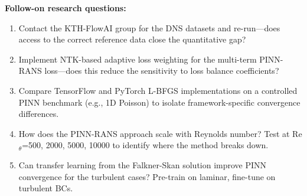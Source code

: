 \noindent\textbf{Follow-on research questions:}
\begin{enumerate}[leftmargin=1.6em,itemsep=0.2em,topsep=0.2em,label=Q\arabic*.]
\item Contact the KTH-FlowAI group for the DNS datasets and re-run---does access to the correct reference data close the quantitative gap?
\item Implement NTK-based adaptive loss weighting for the multi-term PINN-RANS loss---does this reduce the sensitivity to loss balance coefficients?
\item Compare TensorFlow and PyTorch L-BFGS implementations on a controlled PINN benchmark (e.g., 1D Poisson) to isolate framework-specific convergence differences.
\item How does the PINN-RANS approach scale with Reynolds number? Test at Re$_{\theta}$=500, 2000, 5000, 10000 to identify where the method breaks down.
\item Can transfer learning from the Falkner-Skan solution improve PINN convergence for the turbulent cases? Pre-train on laminar, fine-tune on turbulent BCs.
\end{enumerate}

